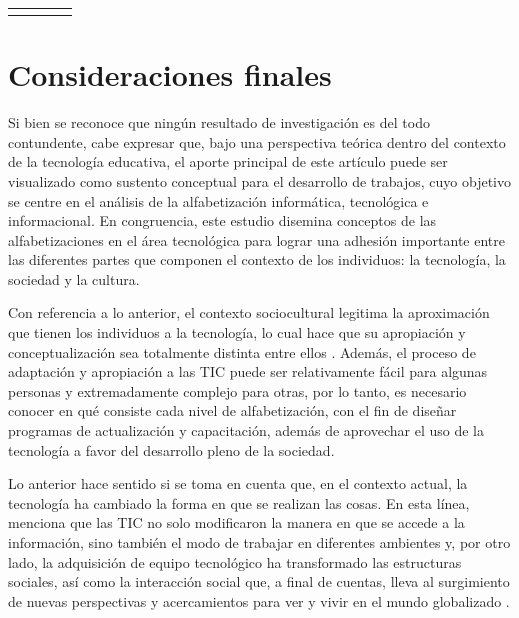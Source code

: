 \documentclass{textolivre}
\begin{document}
\begin{small}
\begin{longtable}{c!{\color[gray]{.7}\vline}c!{\color[gray]{.7}\vline}cp{7.6cm}}
\bottomrule
{}
\end{longtable}
\end{small}

\section{Consideraciones finales}\label{sec-consideracoes}
Si bien se reconoce que ningún resultado de investigación es del todo contundente, cabe expresar que, bajo una perspectiva teórica dentro del contexto de la tecnología educativa, el aporte principal de este artículo puede ser visualizado como sustento conceptual para el desarrollo de trabajos, cuyo objetivo se centre en el análisis de la alfabetización informática, tecnológica e informacional. En congruencia, este estudio disemina conceptos de las alfabetizaciones en el área tecnológica para lograr una adhesión importante entre las diferentes partes que componen el contexto de los individuos: la tecnología, la sociedad y la cultura. 

Con referencia a lo anterior, el contexto sociocultural legitima la aproximación que tienen los individuos a la tecnología, lo cual hace que su apropiación y conceptualización sea totalmente distinta entre ellos \cite{rueda_ramos_adultos_2009}. Además, el proceso de adaptación y apropiación a las TIC puede ser relativamente fácil para algunas personas y extremadamente complejo para otras, por lo tanto, es necesario conocer en qué consiste cada nivel de alfabetización, con el fin de diseñar programas de actualización y capacitación, además de aprovechar el uso de la tecnología a favor del desarrollo pleno de la sociedad. 

Lo anterior hace sentido si se toma en cuenta que, en el contexto actual, la tecnología ha cambiado la forma en que se realizan las cosas. En esta línea, \textcite{castano_munoz_alfabetizaciones_2014} menciona que las TIC no solo modificaron la manera en que se accede a la información, sino también el modo de trabajar en diferentes ambientes y, por otro lado, la adquisición de equipo tecnológico ha transformado las estructuras sociales, así como la interacción social que, a final de cuentas, lleva al surgimiento de nuevas perspectivas y acercamientos para ver y vivir en el mundo globalizado \cite{carrera_cruce_2019}.
\end{document}
